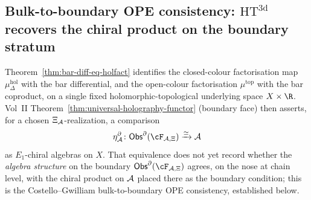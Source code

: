 \subsection{Bulk-to-boundary OPE consistency: $\mathrm{HT}^{3\mathrm{d}}$
recovers the chiral product on the boundary stratum}
\label{subsec:bulk-boundary-OPE-consistency}

Theorem~\ref{thm:bar-diff-eq-holfact} identifies the closed-colour
factorisation map $\mu^{\mathrm{hol}}_\Delta$ with the bar
differential, and the open-colour factorisation
$\mu^{\mathrm{top}}$ with the bar coproduct, on a single fixed
holomorphic-topological underlying space $X \times \R$. Vol~II
Theorem~\ref{thm:universal-holography-functor} (boundary face) then
asserts, for a chosen \(\Xi_{\mathcal{A}}\)-realization, a comparison
\[
\eta^\partial_\cA\colon
\Obs^\partial(\cF_{\cA,\Xi})\xrightarrow{\simeq}\cA
\]
as $E_1$-chiral algebras on $X$. That equivalence does not yet record
whether the \emph{algebra structure} on the boundary
\(\Obs^\partial(\cF_{\cA,\Xi})\) agrees, on the nose at chain level,
with the chiral product on $\mathcal{A}$ placed there as the boundary
condition; this is the Costello--Gwilliam bulk-to-boundary OPE
consistency, established below.

